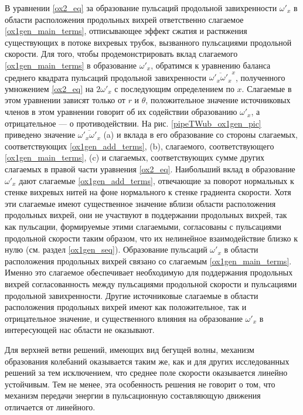 В уравнении \eqref{ox2_eq} за образование пульсаций продольной завихренности $\omega'_x$ в области расположения продольных вихрей ответственно слагаемое \eqref{ox1gen_main_terms}, отписывающее эффект сжатия и растяжения существующих в потоке вихревых трубок, вызванного пульсациями продольной скорости. Для того, чтобы продемонстрировать вклад слагаемого \eqref{ox1gen_main_terms} в образование $\omega'_x$, обратимся к уравнению баланса среднего квадрата пульсаций продольной завихренности $\overline{\omega'_x\omega'_x}^x$, полученного умножением \eqref{ox2_eq} на $2\omega'_x$ с последующим определением по $x$. Слагаемые в этом уравнении зависят только от $r$ и $\theta$, положительное значение источниковых членов в этом уравнении говорит об их содействии образованию $\omega'_x$, а отрицательное --- о противодействии. На рис. \ref{pipeTWub_ox1gen_pic} приведено значение $\overline{\omega'_x\omega'_x}$ (a) и вклада в его образование со стороны слагаемых, соответствующих \eqref{ox1gen_add_terms}, (b), слагаемого, соответствующего \eqref{ox1gen_main_terms}, (c) и слагаемых, соответствующих сумме других слагаемых в правой части уравнения \eqref{ox2_eq}. Наибольший вклад в образование $\omega'_x$ дают слагаемые \eqref{ox1gen_add_terms}, отвечающие за поворот нормальных к стенке вихревых нитей на фоне нормального к стенке градиента скорости. Хотя эти слагаемые имеют существенное значение вблизи области расположения продольных вихрей, они не участвуют в поддержании продольных вихрей, так как пульсации, формируемые этими слагаемыми, согласованы с пульсациями продольной скорости таким образом, что их нелинейное взаимодействие близко к нулю (см. раздел \ref{ox1gen_seq}). Образование пульсаций $\omega'_x$ в области расположения продольных вихрей связано со слагаемым \eqref{ox1gen_main_terms}. Именно это слагаемое обеспечивает необходимую для поддержания продольных вихрей согласованность между пульсациями продольной скорости и пульсациями продольной завихренности. Другие источниковые слагаемые в области расположения продольных вихрей имеют как положительное, так и отрицательное значение, и существенного влияния на образование $\omega'_x$ в интересующей нас области не оказывают. 

Для верхней ветви решений, имеющих вид бегущей волны, механизм образования колебаний оказывается таким же, как и для других исследованных решений за тем исключением, что среднее поле скорости оказывается линейно устойчивым. Тем не менее, эта особенность решения не говорит о том, что механизм передачи энергии в пульсационную составляющую движения отличается от линейного. 



